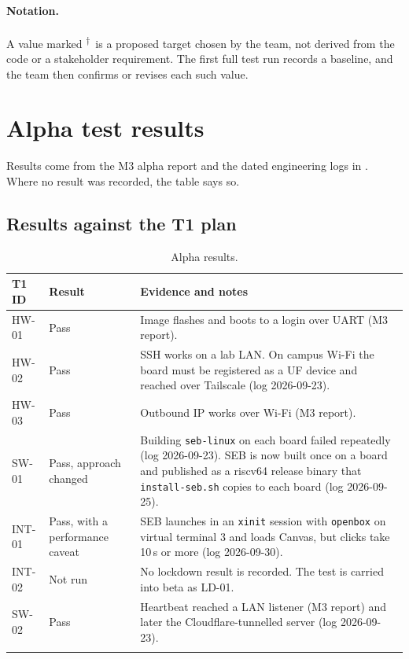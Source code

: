 \documentclass[11pt]{article}
\newcommand{\prop}{\textsuperscript{$\dagger$}}
\begin{document}
\paragraph{Notation.} A value marked \prop\ is a proposed target chosen by the team, not derived from the code or a stakeholder requirement. The first full test run records a baseline, and the team then confirms or revises each such value.

\section{Alpha test results}

Results come from the M3 alpha report and the dated engineering logs in . Where no result was recorded, the table says so.

\subsection{Results against the T1 plan}

\begin{longtable}{@{}p{}p{}p{}@{}}
\toprule
\textbf{T1 ID} & \textbf{Result} & \textbf{Evidence and notes} \\
\midrule
\endhead
HW-01 & Pass & Image flashes and boots to a login over UART (M3 report). \\
HW-02 & Pass & SSH works on a lab LAN. On campus Wi-Fi the board must be registered as a UF device and reached over Tailscale (log 2026-09-23). \\
HW-03 & Pass & Outbound IP works over Wi-Fi (M3 report). \\
SW-01 & Pass, approach changed & Building \texttt{seb-linux} on each board failed repeatedly (log 2026-09-23). SEB is now built once on a board and published as a riscv64 release binary that \texttt{install-seb.sh} copies to each board (log 2026-09-25). \\
INT-01 & Pass, with a performance caveat & SEB launches in an \texttt{xinit} session with \texttt{openbox} on virtual terminal 3 and loads Canvas, but clicks take 10\,s or more (log 2026-09-30). \\
INT-02 & Not run & No lockdown result is recorded. The test is carried into beta as LD-01. \\
SW-02 & Pass & Heartbeat reached a LAN listener (M3 report) and later the Cloudflare-tunnelled server (log 2026-09-23). \\
\bottomrule
\caption{Alpha results.}\label{tab:alpha}
\end{longtable}
\end{document}
